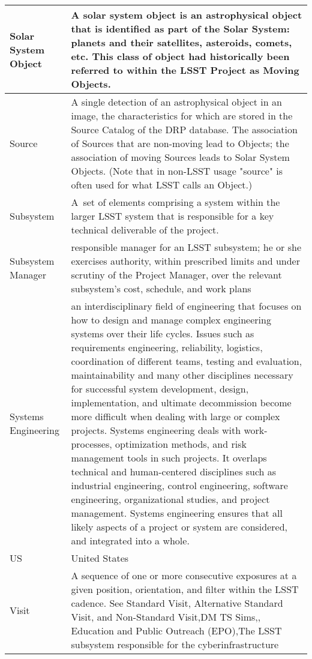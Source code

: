 \begin{longtable}{|l|p{}|}
Solar System \gls{Object} & A solar system object is an astrophysical object that is identified as part of the Solar System: planets and their satellites, asteroids, comets, etc. This class of object had historically been referred to within the \gls{LSST} Project as Moving Objects. \\\hline
Source & A single detection of an astrophysical object in an image, the characteristics for which are stored in the \gls{Source} Catalog of the \gls{DRP} database. The association of Sources that are non-moving lead to Objects; the association of moving Sources leads to Solar System Objects. (Note that in non-LSST usage "source" is often used for what \gls{LSST} calls an \gls{Object}.) \\\hline
Subsystem & A set of elements comprising a system within the larger \gls{LSST} system that is responsible for a key technical deliverable of the project. \\\hline
Subsystem Manager & responsible manager for an LSST subsystem; he or she exercises authority, within prescribed limits and under scrutiny of the Project Manager, over the relevant subsystem's cost, schedule, and work plans \\\hline
Systems Engineering & an interdisciplinary field of engineering that focuses on how to design and manage complex engineering systems over their life cycles. Issues such as requirements engineering, reliability, logistics, coordination of different teams, testing and evaluation, maintainability and many other disciplines necessary for successful system development, design, implementation, and ultimate decommission become more difficult when dealing with large or complex projects. Systems engineering deals with work-processes, optimization methods, and risk management tools in such projects. It overlaps technical and human-centered disciplines such as industrial engineering, control engineering, software engineering, organizational studies, and project management. Systems engineering ensures that all likely aspects of a project or system are considered, and integrated into a whole. \\\hline
US & United States \\\hline
Visit & A sequence of one or more consecutive exposures at a given position, orientation, and filter within the \gls{LSST} cadence. See Standard Visit, \gls{Alternative Standard Visit}, and \gls{Non-Standard Visit},\gls{DM} \gls{TS} Sims,,
Education and Public Outreach (\gls{EPO}),The \gls{LSST} subsystem responsible for the cyberinfrastructure \\\hline

\end{longtable}

